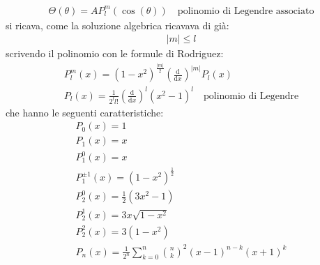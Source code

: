 \begin{equation}\begin{split}
\Theta\left(\theta\right)=AP_l^m\left(\cos{\left(\theta\right)}\right) \quad \textrm{polinomio di Legendre associato}
\end{split}\end{equation}
si ricava, come la soluzione algebrica ricavava di già:
\begin{equation}\begin{split}
|m|\le l
\end{split}\end{equation}
scrivendo il polinomio con le formule di Rodriguez:
\begin{equation}\begin{split}
P_l^m\left(x\right)=\left(1-x^2\right)^{\frac{|m|}{2}}\left(\frac{\textrm{d}}{\textrm{d}x}\right)^{|m|}P_l\left(x\right)\\
P_l\left(x\right)=\frac{1}{2^ll!}\left(\frac{\textrm{d}}{\textrm{d}x}\right)^l\left(x^2-1\right)^l \quad \textrm{polinomio di Legendre}
\end{split}\end{equation}
che hanno le seguenti caratteristiche:
\begin{equation}\begin{split}
P_0\left(x\right)=1 \\
P_1\left(x\right)=x \\
P_1^0\left(x\right)=x \\
P_1^{\pm 1}\left(x\right)=\left(1-x^2\right)^{\frac{1}{2}} \\
P_2^0\left(x\right)=\frac{1}{2}\left(3x^2-1\right) \\
P_2^1\left(x\right)=3x\sqrt{1-x^2} \\
P_2^2\left(x\right)=3\left(1-x^2\right) \\
P_n\left(x\right)=\frac{1}{2^n}\sum_{k=0}^{n}{{{n}\choose{k}}^2\left(x-1\right)^{n-k}\left(x+1\right)^{k}}
\end{split}\end{equation}

